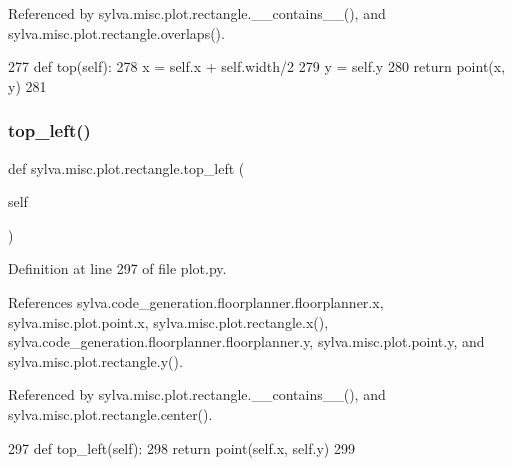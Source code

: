 Referenced by sylva.\+misc.\+plot.\+rectangle.\+\_\+\+\_\+contains\+\_\+\+\_\+(), and sylva.\+misc.\+plot.\+rectangle.\+overlaps().


\begin{DoxyCode}
277     \textcolor{keyword}{def }top(self):
278       x = self.x + self.width/2
279       y = self.y
280       \textcolor{keywordflow}{return} point(x, y)
281 
\end{DoxyCode}
\mbox{\label{classsylva_1_1misc_1_1plot_1_1rectangle_ac763b52f6d533f4b006421eae5f81b56}} 
\subsubsection{\texorpdfstring{top\+\_\+left()}{top\_left()}}
{\footnotesize\ttfamily def sylva.\+misc.\+plot.\+rectangle.\+top\+\_\+left (\begin{DoxyParamCaption}\item[{}]{self }\end{DoxyParamCaption})}



Definition at line 297 of file plot.\+py.



References sylva.\+code\+\_\+generation.\+floorplanner.\+floorplanner.\+x, sylva.\+misc.\+plot.\+point.\+x, sylva.\+misc.\+plot.\+rectangle.\+x(), sylva.\+code\+\_\+generation.\+floorplanner.\+floorplanner.\+y, sylva.\+misc.\+plot.\+point.\+y, and sylva.\+misc.\+plot.\+rectangle.\+y().



Referenced by sylva.\+misc.\+plot.\+rectangle.\+\_\+\+\_\+contains\+\_\+\+\_\+(), and sylva.\+misc.\+plot.\+rectangle.\+center().


\begin{DoxyCode}
297     \textcolor{keyword}{def }top\_left(self):
298       \textcolor{keywordflow}{return} point(self.x, self.y)
299 
\end{DoxyCode}
\mbox{\label{classsylva_1_1misc_1_1plot_1_1rectangle_a54324a7b1be1bd85655ee60686d5944f}} 
